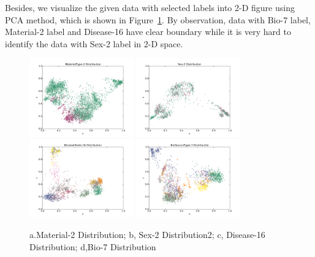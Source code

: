 \documentclass[sigconf]{acmart}
\begin{document}
	
	Besides, we visualize the given data with selected labels into 2-D figure using PCA method, which is shown in Figure~\ref{distribution_1}. By observation, data with Bio-7 label, Material-2 label and Disease-16 have clear boundary while it is very hard to identify the data with Sex-2 label in 2-D space.

	\begin{figure}[]
		\centering
		\includegraphics[width=0.4\textwidth]{../figs/Material-2.pdf}
		\includegraphics[width=0.4\textwidth]{../figs/Sex-2.pdf}
		\includegraphics[width=0.4\textwidth]{../figs/Disease-16.pdf}
		\includegraphics[width=0.4\textwidth]{../figs/Bio-7.pdf}
		\caption{a.Material-2 Distribution;  b, Sex-2 Distribution2; c, Disease-16 Distribution; d,Bio-7 Distribution}
		\label{distribution_1}
		\centering
	\end{figure}
	
\end{document}
